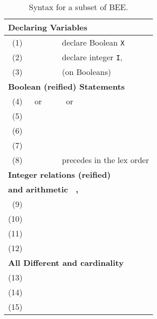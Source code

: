 \documentclass{tlp}
\newcommand{\bee}{\textsf{BEE}}
\begin{document}
\begin{table}[t]
  \centering
\begin{tabular}{rlll}
\hline\hline
\multicolumn{4}{l}{\bf\small Declaring Variables}\\
\hline
(1) & &\qquad\qquad &declare Boolean \texttt{X}
\\
(2) & & & 
               declare integer \texttt{I},  \\
(3) &     &
          &
           (on Booleans)\\
\hline
\multicolumn{4}{l}{\bf\small Boolean (reified) Statements~ 
       \hfill }\\
\hline
(4) &     ~or~ &
          &
           ~or~ \\
(5) &     &
          &
          \\
(6) &     &
          &
          \\
(7) &     &
          &
          \\
(8) &      &&
              precedes  in the lex order\\
\hline

\multicolumn{4}{l}{\bf\small Integer relations (reified)
                    \hfill }\\
\multicolumn{4}{l}{\bf\small and arithmetic \hfill
            ~, 
               }\\
    \hline
(9) &      &
          &
          \\
(10) &     &
          &
          \\
(11) & &
      &
      \\
(12) & &
      &
      \\
\hline

\multicolumn{4}{l}{\bf\small  All Different and cardinality~
            \hfill }\\
    \hline
(13) &     &
          &
          \\
(14) &     &
          &
          \\
(15) &     &
          &
          \\





\hline\hline
\end{tabular}
  \caption{Syntax for a subset of \bee. }
  \label{tab:beeStntax}
\end{table}
\end{document}
